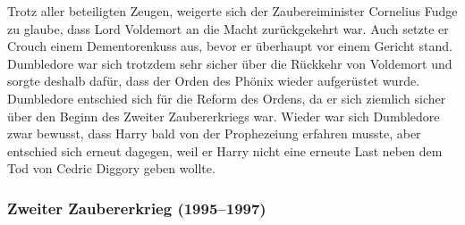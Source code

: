 \documentclass[a4paper, 10pt]{article}
\begin{document}
\vspace{10pt}
\newline
{}  
Trotz aller beteiligten Zeugen, weigerte sich der Zaubereiminister Cornelius Fudge zu glaube, dass Lord Voldemort an die Macht zurückgekehrt war. Auch setzte er Crouch einem Dementorenkuss aus, bevor er überhaupt vor einem Gericht stand. Dumbledore war sich trotzdem sehr sicher über die Rückkehr von Voldemort und sorgte deshalb dafür, dass der Orden des Phönix wieder aufgerüstet wurde. Dumbledore entschied sich für die Reform des Ordens, da er sich ziemlich sicher über den Beginn des Zweiter Zaubererkriegs war.
\vspace{10pt}
\newline
{}  
Wieder war sich Dumbledore zwar bewusst, dass Harry bald von der Prophezeiung erfahren musste, aber entschied sich erneut dagegen, weil er Harry nicht eine erneute Last neben dem Tod von Cedric Diggory geben wollte.



\subsubsection*{\large Zweiter Zaubererkrieg (1995–1997)}
\end{document}
